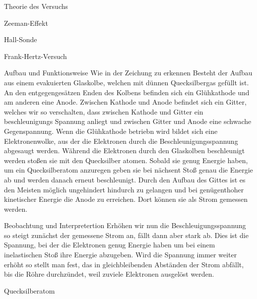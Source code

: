 \documentclass[pdftex, a4paper,11pt, twoside, ngerman]{report}
\begin{document}
\begin{chapter}{Theorie des Versuchs}
\begin{section}{Zeeman-Effekt}
\begin{subsection}{Hall-Sonde}
        \end{subsection}
    \end{section}

    \begin{section}{Frank-Hertz-Versuch}

        \begin{subsection}{Aufbau und Funktionsweise}
            Wie in der Zeichung zu erkennen Besteht der Aufbau aus einem evakuierten Glaskolbe, welchen mit dünnen Quecksilbergas gefüllt ist. 
            An den entgegengesätzen Enden des Kolbens befinden sich ein Glühkathode und am anderen eine Anode. 
            Zwischen Kathode und Anode befindet sich ein Gitter, welches wir so verschalten, dass zwischen Kathode und Gitter ein beschleunigungs Spannung anliegt und zwischen Gitter und Anode eine schwache Gegenspannung.
            Wenn die Glühkathode betriebn wird bildet sich eine Elektronenwolke, aus der die Elektronen durch die Beschleunigungsspannung abgesaugt werden.
            Während die Elektronen durch den Glaskolben beschleunigt werden stoßen sie mit den Quecksilber atomen.
            Sobald sie genug Energie haben, um ein Quecksilberatom anzuregen geben sie bei nächsent Stoß genau die Energie ab und werden danach erneut beschleunigt.
            Durch den Aufbau des Gittes ist es den Meisten möglich ungehindert hindurch zu gelangen und bei genügenthoher kinetischer Energie die Anode zu erreichen.
            Dort können sie als Strom gemessen werden.
            

        \end{subsection}
        \begin{subsection}{Beobachtung und Interpretertion}
            Erhöhen wir nun die Beschleuigungsspannung so steigt zunächst der gemessene Strom an, fällt dann aber stark ab.
            Dies ist die Spannung, bei der die Elektronen genug Energie haben um bei einem inelastischen Stoß ihre Energie abzugeben.
            Wird die Spannung immer weiter erhöht so stellt man fest, das in gleichbleibenden Abständen der Strom abfällt, bis die Röhre durchzündet, weil zuviele Elektronen ausgelöst werden. 

        \end{subsection}
        \begin{subsection}{Quecksilberatom}

        \end{subsection}

    

    \end{section}
    
  \end{chapter}
         
\end{document}
